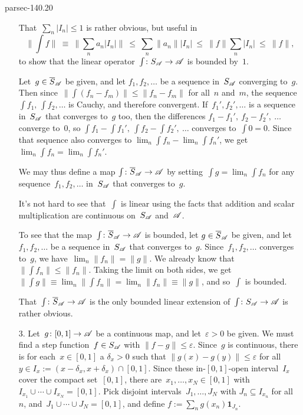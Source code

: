\documentclass[b5page]{book}
\begin{document}
\begin{solution}{parsec-140.20}
\begin{enumerate}
That~$\sum_n\left|I_n\right| \leq 1$ is rather obvious,
but useful in
\begin{equation*}
    \textstyle
    \|\int f \|
\ \equiv\  \|\sum_n a_n \left|I_n\right| \|
\ \leq\  \sum_n \|a_n\| \left|I_n\right|
\ \leq\  \|f\| \sum_n \left|I_n\right|
\ \leq\  \|f\|,
\end{equation*}
to show that the linear operator~$\int\colon S_\scrA\to \scrA$
is bounded by~$1$.

Let~$g\in \overline{S}_\scrA$ be given,
and let
$f_1,f_2,\dotsc$ be a sequence in~$S_\scrA$ converging
to~$g$.
Then since~$\|\int (f_n-f_m)\|\leq \|f_n-f_m\|$
for all~$n$ and~$m$,
the sequence~$\int f_1, \,\int f_2,\dotsc$
is Cauchy,
and therefore convergent.
If~$f_1',f_2',\dotsc$ is a sequence in~$S_\scrA$
that converges to~$g$ too,
then the differences $f_1-f_1',\ f_2-f_2',\ \dotsc$
converge to~$0$,
so $\int f_1 - \int f_1',\ \int f_2-\int f_2',\ \dotsc$
converges to~$\int 0 = 0$.
Since that sequence also converges to
$\lim_n \int f_n - \lim_n \int f_n'$,
we
get~$\lim_n \int f_n = \lim_n \int f_n'$.

We may thus define a map $\int\colon \overline{S}_\scrA \to\scrA$
by setting~$\int g = \lim_n \int f_n$
for any sequence~$f_1,f_2,\dotsc $ in~$S_\scrA$
that converges to~$g$.

It's not hard to see that~$\int$ is linear
using the facts that addition and scalar multiplication
are continuous on~$S_\scrA$ and~$\scrA$.

To see that the map~$\int\colon \overline{S}_\scrA\to\scrA$
is bounded,
let $g\in\overline{S}_\scrA$ be given,
and let~$f_1,f_2,\dotsc$ be a sequence in~$S_\scrA$
that converges to~$g$.
Since~$f_1,f_2,\dotsc$ converges to~$g$,
we have~$\lim_n \|f_n\| = \|g\|$.
We already know that~$\| \int f_n \| \leq \|f_n\|$.
Taking the limit on both sides, we get
$\|\int g\| \equiv \lim_n \|\int f_n\| = \lim_n \|f_n\| \equiv
\|g\|$,
and so~$\int$ is bounded.

That~$\int\colon \overline{S}_\scrA\to \scrA$
is the only bounded linear extension of~$\int\colon S_\scrA\to\scrA$
is rather obvious.

\item[3.]
Let~$g\colon [0,1]\to\mathscr{A}$
be a continuous map,
and let~$\varepsilon>0$ be given.
We must find a step function~$f\in S_{\mathscr{A}}$
with $\|f-g\|\leq \varepsilon$.
Since~$g$ is continuous,
there is
for each~$x\in [0,1]$
a $\delta_x>0$
such that $\|g(x)-g(y)\|\leq \varepsilon$
for all~$y\in I_x:=(x-\delta_x,x+\delta_x)\cap[0,1]$.
Since these in-$[0,1]$-open interval~$I_x$
cover the compact set~$[0,1]$,
there are~$x_1,\dotsc,x_N\in [0,1]$
with~$I_{x_1}\cup \dotsb\cup I_{x_N} = [0,1]$.
Pick disjoint intervals~$J_1,\dotsc,J_N$
with $J_n\subseteq I_{x_n}$ for all~$n$,
and~$J_1\cup \dotsb\cup J_N=[0,1]$,
and define $f:= \sum_n g(x_n) \mathbf{1}_{J_n}$.


\end{enumerate}
\end{solution}
\end{document}
